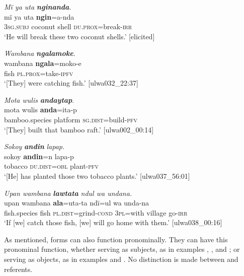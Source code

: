 \ea%
    \label{ex:det:133}
          \textit{Mï ya uta} \textbf{\textit{nginanda}}.\\
\gll mï      ya      uta    \textbf{ngin}=a-nda\\
    3\textsc{sg.subj}  coconut  shell  \textsc{du.prox}=break-\textsc{irr}\\
\glt `He will break these two coconut shells.’ [elicited]
\z

\ea%
    \label{ex:det:134}
          \textit{Wambana} \textbf{\textit{ngalamoke}}.\\
\gll wambana  \textbf{ngala}=moko-e\\
    fish    \textsc{pl.prox}=take-\textsc{ipfv}\\
\glt `[They] were catching fish.’ [ulwa032\_22:37]
\z

\ea%
    \label{ex:det:135}
          \textit{Mota wulis} \textbf{\textit{andaytap}}.\\
\gll mota    wulis    \textbf{anda}=ita-p\\
    bamboo.species  platform  \textsc{sg.dist}=build-\textsc{pfv}\\
\glt `[They] built that bamboo raft.’ [ulwa002\_00:14]
\z

\ea%
    \label{ex:det:136}
          \textit{Sokoy} \textbf{\textit{andin}} \textit{lapap.}\\
\gll    sokoy    \textbf{andin}=n    lapa-p\\
    tobacco  \textsc{du.dist=obl}  plant-\textsc{pfv}\\
\glt `[He] has planted those two tobacco plants.’ [ulwa037\_56:01]
\z

\ea%
    \label{ex:det:137}
          \textit{Upan wambana} \textbf{\textit{lawtata}} \textit{ndul wa undana.}\\
\gll    upan  wambana  \textbf{ala}=uta-ta      ndï=ul    wa    unda-na\\
    fish.species   fish    \textsc{pl.dist}=grind\textsc{{}-cond} 3\textsc{pl}=with  village  go-\textsc{irr}\\
\glt `If [we] catch those fish, [we] will go home with them.’ [ulwa038\_00:16]
\z

As mentioned,  forms can also function pronominally. They can have this pronominal function, whether serving as subjects, as in examples , , and ; or serving as objects, as in examples  and . No distinction is made between  and  referents.

